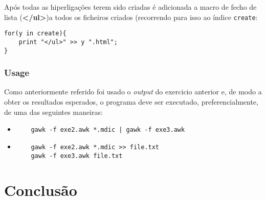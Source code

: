 \documentclass{llncs}
\begin{document}
Após todas as hiperligações terem sido criadas é adicionada a macro de fecho de lista (\textbf{</ul>})a todos os ficheiros criados (recorrendo para isso ao índice \texttt{create}:
\begin{verbatim}
for(y in create){
    print "</ul>" >> y ".html";
}
\end{verbatim}

\subsubsection{Usage}
Como anteriormente referido foi usado o \textit{output} do exercicio anterior e, de modo a obter os resultados esperados, o programa deve ser executado, preferencialmente, de uma das seguintes maneiras:
\begin{itemize}
    \item \begin{verbatim}
    gawk -f exe2.awk *.mdic | gawk -f exe3.awk
    \end{verbatim}
    \item \begin{verbatim}
    gawk -f exe2.awk *.mdic >> file.txt
    gawk -f exe3.awk file.txt
    \end{verbatim}
\end{itemize}

\section{Conclusão}
\end{document}
